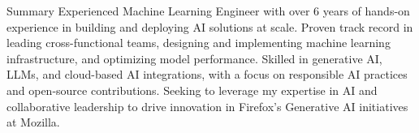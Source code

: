 \documentclass{resume}
\begin{document}
\begin{rSection}{Summary}
    Experienced Machine Learning Engineer with over 6 years of hands-on experience in building and deploying AI solutions at scale. Proven track record in leading cross-functional teams, designing and implementing machine learning infrastructure, and optimizing model performance. Skilled in generative AI, LLMs, and cloud-based AI integrations, with a focus on responsible AI practices and open-source contributions. Seeking to leverage my expertise in AI and collaborative leadership to drive innovation in Firefox's Generative AI initiatives at Mozilla.
\end{rSection}

\end{document}
